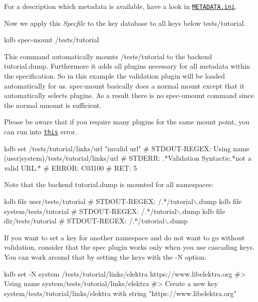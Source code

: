 For a description which metadata is available, have a look in \href{/home/jenkins/workspace/libelektra-release/doc/METADATA.ini}{\tt M\+E\+T\+A\+D\+A\+T\+A.\+ini}.

Now we apply this {\itshape Specfile} to the key database to all keys below {\ttfamily tests/tutorial}.


\begin{DoxyCode}
kdb spec-mount /tests/tutorial
\end{DoxyCode}


This command automatically mounts {\ttfamily /tests/tutorial} to the backend {\ttfamily tutorial.\+dump}. Furthermore it adds all plugins necessary for all metadata within the specification. So in this example the validation plugin will be loaded automatically for us. {\ttfamily spec-\/mount} basically does a normal mount except that it automatically selects plugins. As a result there is no {\ttfamily spec-\/umount} command since the normal {\ttfamily umount} is sufficient.

Please be aware that if you require many plugins for the same mount point, you can run into \href{https://github.com/ElektraInitiative/libelektra/issues/2133}{\tt this} error.


\begin{DoxyCode}
kdb set /tests/tutorial/links/url "invalid url"
# STDOUT-REGEX: Using name (user|system)/tests/tutorial/links/url
# STDERR: .*Validation Syntactic.*not a valid URL.*
# ERROR:  C03100
# RET:    5
\end{DoxyCode}


Note that the backend {\ttfamily tutorial.\+dump} is mounted for all namespaces\+:


\begin{DoxyCode}
kdb file user/tests/tutorial
# STDOUT-REGEX: /.*/tutorial\(\backslash\).dump
kdb file system/tests/tutorial
# STDOUT-REGEX: /.*/tutorial\(\backslash\).dump
kdb file dir/tests/tutorial
# STDOUT-REGEX: /.*/tutorial\(\backslash\).dump
\end{DoxyCode}


If you want to set a key for another namespace and do not want to go without validation, consider that the spec plugin works only when you use cascading keys. You can work around that by setting the keys with the {\ttfamily -\/N} option\+:


\begin{DoxyCode}
kdb set -N system /tests/tutorial/links/elektra https://www.libelektra.org
#> Using name system/tests/tutorial/links/elektra
#> Create a new key system/tests/tutorial/links/elektra with string "https://www.libelektra.org"
\end{DoxyCode}


